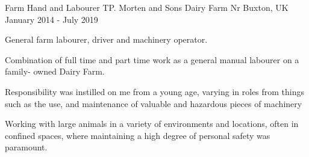 \begin{cventries}
  \cventry
    {Farm Hand and Labourer} %
    {TP. Morten and Sons Dairy Farm} %
    {Nr Buxton, UK} %
    {January 2014 - July 2019} %
    {
      \begin{cvitems} %
        \item {General farm labourer, driver and machinery operator.}
        \item {Combination of full time and part time work as a general manual labourer on a family- owned Dairy Farm.}
        \item{Responsibility was instilled on me from a young age, varying in roles from things such as the use, and maintenance of valuable and hazardous pieces of machinery} 
        \item{Working with large animals in a variety of environments and locations, often in confined spaces, where maintaining a high degree of personal safety was paramount.}
      \end{cvitems}
    }
\end{cventries}
